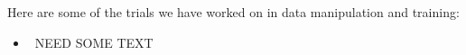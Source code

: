 %
Here are some of the trials we have worked on in data manipulation and training:
\begin{itemize}
	\item {\color{blue}\ NEED SOME TEXT}
\end{itemize}